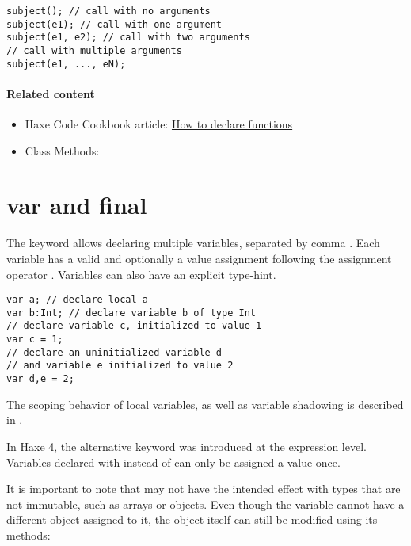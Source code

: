 \begin{lstlisting}
subject(); // call with no arguments
subject(e1); // call with one argument
subject(e1, e2); // call with two arguments
// call with multiple arguments
subject(e1, ..., eN);
\end{lstlisting}


\paragraph{Related content}
\begin{itemize}
	\item Haxe Code Cookbook article: \href{http://code.haxe.org/category/beginner/declare-functions.html}{How to declare functions}
	\item Class Methods: 
\end{itemize}


\section{var and final}
\label{expression-var}

The  keyword allows declaring multiple variables, separated by comma \expr{,}. Each variable has a valid  and optionally a value assignment following the assignment operator \expr{=}. Variables can also have an explicit type-hint.

\begin{lstlisting}
var a; // declare local a
var b:Int; // declare variable b of type Int
// declare variable c, initialized to value 1
var c = 1;
// declare an uninitialized variable d
// and variable e initialized to value 2
var d,e = 2;
\end{lstlisting}

The scoping behavior of local variables, as well as variable shadowing is described in .


In Haxe 4, the alternative keyword  was introduced at the expression level. Variables declared with  instead of  can only be assigned a value once.


It is important to note that  may not have the intended effect with types that are not immutable, such as arrays or objects. Even though the variable cannot have a different object assigned to it, the object itself can still be modified using its methods:

